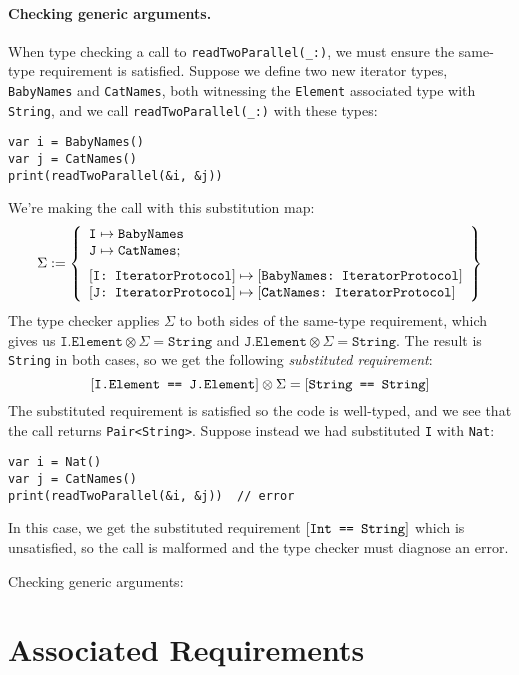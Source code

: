 \documentclass[../generics]{subfiles}
\begin{document}
\paragraph{Checking generic arguments.}
When type checking a call to \verb|readTwoParallel(_:)|, we must ensure the same-type requirement is satisfied. Suppose we define two new iterator types, \texttt{BabyNames} and \texttt{CatNames}, both witnessing the \texttt{Element} associated type with \texttt{String}, and we call \verb|readTwoParallel(_:)| with these types:
\begin{Verbatim}
var i = BabyNames()
var j = CatNames()
print(readTwoParallel(&i, &j))
\end{Verbatim}
We're making the call with this substitution map:
\[
\Sigma := \SubstMapLongC{\SubstType{I}{BabyNames}\\
\SubstType{J}{CatNames}}{
\SubstConf{I}{BabyNames}{IteratorProtocol}\\
\SubstConf{J}{CatNames}{IteratorProtocol}}
\]
The type checker applies $\Sigma$ to both sides of the same-type requirement, which gives us $\texttt{I.Element}\otimes\Sigma=\texttt{String}$ and $\texttt{J.Element}\otimes\Sigma=\texttt{String}$. The result is \texttt{String} in both cases, so we get the following \emph{substituted requirement}:
\[[\texttt{I.Element == J.Element}]\otimes\Sigma=[\texttt{String == String}]\]
The substituted requirement is satisfied so the code is well-typed, and we see that the call returns \texttt{Pair<String>}. Suppose instead we had substituted \texttt{I} with \texttt{Nat}:
\begin{Verbatim}
var i = Nat()
var j = CatNames()
print(readTwoParallel(&i, &j))  // error
\end{Verbatim}
In this case, we get the substituted requirement $[\texttt{Int == String}]$ which is unsatisfied, so the call is malformed and the type checker must diagnose an error.

\begin{MoreDetails}
\item Checking generic arguments: 
\end{MoreDetails}

\section{Associated Requirements}
\end{document}
